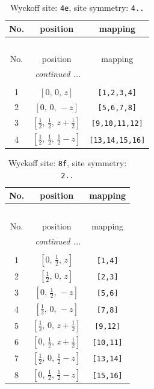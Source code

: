 \documentclass[fleqn,8pt]{jsarticle}
\begin{document}
\renewcommand{\arraystretch}{1.2}
\begin{longtable}{ccc}
\caption{Wyckoff site: {\tt 4e}, site symmetry: {\tt 4..}}
 \\
 \hline \hline
No. & position & mapping \\ \hline \endfirsthead

\multicolumn{2}{l}{\tablename\ \thetable{}} \\
 \hline \hline
No. & position & mapping \\ \hline \endhead

 \hline \hline
\multicolumn{2}{r}{\footnotesize\it continued ...} \\ \endfoot

 \hline \hline
\multicolumn{2}{r}{} \\ \endlastfoot

1 & $\left[ 0,\, 0,\, z \right]$ & {\tt [1,2,3,4]} \\ \hline
2 & $\left[ 0,\, 0,\, - z \right]$ & {\tt [5,6,7,8]} \\ \hline
3 & $\left[ \frac{1}{2},\, \frac{1}{2},\, z + \frac{1}{2} \right]$ & {\tt [9,10,11,12]} \\ \hline
4 & $\left[ \frac{1}{2},\, \frac{1}{2},\, \frac{1}{2} - z \right]$ & {\tt [13,14,15,16]} \\
\end{longtable}
\renewcommand{\arraystretch}{1.2}
\begin{longtable}{ccc}
\caption{Wyckoff site: {\tt 8f}, site symmetry: {\tt 2..}}
 \\
 \hline \hline
No. & position & mapping \\ \hline \endfirsthead

\multicolumn{2}{l}{\tablename\ \thetable{}} \\
 \hline \hline
No. & position & mapping \\ \hline \endhead

 \hline \hline
\multicolumn{2}{r}{\footnotesize\it continued ...} \\ \endfoot

 \hline \hline
\multicolumn{2}{r}{} \\ \endlastfoot

1 & $\left[ 0,\, \frac{1}{2},\, z \right]$ & {\tt [1,4]} \\ \hline
2 & $\left[ \frac{1}{2},\, 0,\, z \right]$ & {\tt [2,3]} \\ \hline
3 & $\left[ 0,\, \frac{1}{2},\, - z \right]$ & {\tt [5,6]} \\ \hline
4 & $\left[ \frac{1}{2},\, 0,\, - z \right]$ & {\tt [7,8]} \\ \hline
5 & $\left[ \frac{1}{2},\, 0,\, z + \frac{1}{2} \right]$ & {\tt [9,12]} \\ \hline
6 & $\left[ 0,\, \frac{1}{2},\, z + \frac{1}{2} \right]$ & {\tt [10,11]} \\ \hline
7 & $\left[ \frac{1}{2},\, 0,\, \frac{1}{2} - z \right]$ & {\tt [13,14]} \\ \hline
8 & $\left[ 0,\, \frac{1}{2},\, \frac{1}{2} - z \right]$ & {\tt [15,16]} \\
\end{longtable}
\end{document}
